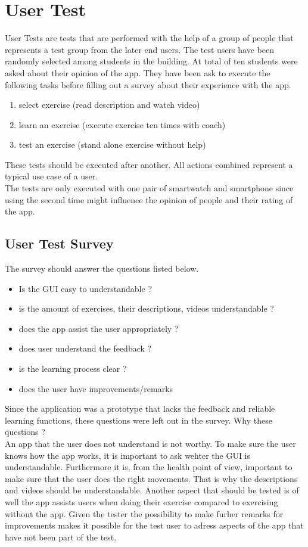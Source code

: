 \section{User Test}
User Tests are tests that are performed with the help of a group of people that represents a test group from the later end users. The test users have been randomly selected among students in the building. At total of ten students were asked about their opinion of the app. They have been ask to execute the following tasks before filling out a survey about their experience with the app.
\begin{enumerate}
\item select exercise (read description and watch video)
\item learn an exercise (execute exercise ten times with coach)
\item test an exercise (stand alone exercise without help)
\end{enumerate}

These tests should be executed after another. All actions combined represent a typical use case of a user.\\
The tests are only executed with one pair of smartwatch and smartphone since using the second time might influence the opinion of people and their rating of the app.

\subsection{User Test Survey}
The survey should answer the questions listed below.
\begin{itemize}
\item Is the GUI easy to understandable ?
\item is the amount of exercises, their descriptions, videos understandable ?
\item does the app assist the user appropriately ?
\item does user understand the feedback ?
\item is the learning process clear ?
\item does the user have improvements/remarks
\end{itemize}
Since the application was a prototype that lacks the feedback and reliable learning functions, these questions were left out in the survey.
Why these questions ?\\
An app that the user does not understand is not worthy. To make sure the user knows how the app works, it is important to ask wehter the GUI is understandable.
Furthermore it is, from the health point of view, important to make sure that the user does the right movements. That is why the descriptions and videos should be understandable. Another aspect that should be tested is of well the app assists users when doing their exercise compared to exercising without the app.
Given the tester the possibility to make furher remarks for improvements makes it possible for the test user to adress aspects of the app that have not been part of the test.

